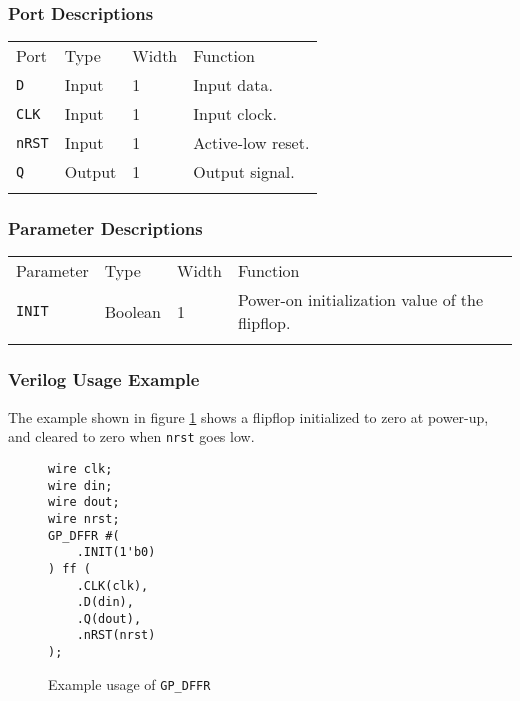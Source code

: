 \documentclass[11pt]{article}
\newcommand{\tokenstyle}[1]{\texttt{#1}}
\newcommand{\wirestyle}[1]{\texttt{#1}}
\newcommand{\whenstyle}[1]{{\fontseries{sb}\selectfont#1}}
\newcommand{\thinhline}{\Xhline{1\arrayrulewidth}}
\newcommand{\thickhline}{\Xhline{2.5\arrayrulewidth}}
\begin{document}
\subsubsection{Port Descriptions}

\begin{tabularx}{\textwidth}{lllX}
\thinhline
\whenstyle{Port} & \whenstyle{Type} & \whenstyle{Width} & \whenstyle{Function} \\
\thickhline
\tokenstyle{D} & Input & 1 & Input data. \\
\thinhline
\tokenstyle{CLK} & Input & 1 & Input clock. \\
\thinhline
\tokenstyle{nRST} & Input & 1 & Active-low reset. \\
\thinhline
\tokenstyle{Q} & Output & 1 & Output signal. \\
\thinhline
\end{tabularx}

\subsubsection{Parameter Descriptions}

\begin{tabularx}{\textwidth}{lllX}
\thinhline
\whenstyle{Parameter} & \whenstyle{Type} & \whenstyle{Width} & \whenstyle{Function} \\
\thickhline
\tokenstyle{INIT} & Boolean & 1 & Power-on initialization value of the flipflop. \\
\thinhline
\end{tabularx}

\subsubsection{Verilog Usage Example}

The example shown in figure \ref{gp-dffr-example} shows a flipflop initialized to zero at power-up, and cleared to zero
when \wirestyle{nrst} goes low.

\begin{figure}[h]
\begin{lstlisting}
wire clk;
wire din;
wire dout;
wire nrst;
GP_DFFR #(
	.INIT(1'b0)
) ff (
	.CLK(clk),
	.D(din),
	.Q(dout),
	.nRST(nrst)
);
\end{lstlisting}
\caption{Example usage of \tokenstyle{GP\_DFFR}}
\label{gp-dffr-example}
\end{figure}

\end{document}
